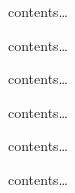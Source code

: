 \begin{multicols}{3}

\begin{minipage}[b]{0.2\columnwidth}

contents\ldots{}

\end{minipage}\begin{minipage}[b]{0.8\columnwidth}

contents\ldots{}

\end{minipage}

\begin{minipage}[b]{0.2\columnwidth}

contents\ldots{}

\end{minipage}\begin{minipage}[b]{0.8\columnwidth}

contents\ldots{}

\end{minipage}

\begin{minipage}[b]{0.2\columnwidth}

contents\ldots{}

\end{minipage}\begin{minipage}[b]{0.8\columnwidth}

contents\ldots{}

\end{minipage}

\end{multicols}
